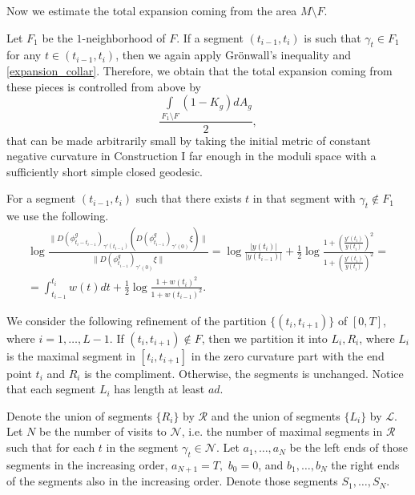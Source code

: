 \documentclass[12pt]{article}
\numberwithin{equation}{section}
\theoremstyle{definition}
\begin{document}
Now we estimate the total expansion coming from the area $M\setminus F$. 

Let $F_1$ be the $1$-neighborhood of $F$. If a segment $(t_{i-1}, t_{i})$ is such that $\gamma_t\in F_1$ for any $t\in(t_{i-1},t_i)$, then we again apply Gr\"onwall's inequality and \eqref{expansion_collar}. Therefore, we obtain that the total expansion coming from these pieces is controlled from above by 
\begin{equation}\label{input_1_nbd}
\frac{\int\limits_{F_1\setminus F}(1-K_g)dA_g}{2},
\end{equation}
that can be made arbitrarily small by taking the initial metric of constant negative curvature in Construction I far enough in the moduli space with a sufficiently short simple closed geodesic.

For a segment $(t_{i-1}, t_{i})$ such that there exists $t$ in that segment with $\gamma_t\notin F_1$ we use the following. 
\begin{multline}\label{expansion_hands}
\log\frac{\|D(\phi^g_{t_i-t_{i-1}})_{\gamma'(t_{i-1})}(D(\phi^g_{t_{i-1}})_{\gamma'(0)}\xi)\|}{\|D(\phi^g_{t_{i-1}})_{\gamma'(0)}\xi\|} = \log\frac{|y(t_i)|}{|y(t_{i-1})|}+\frac{1}{2}\log\frac{1+\left(\frac{y'(t_i)}{y(t_i)}\right)^2}{1+\left(\frac{y'(t_i)}{y(t_i)}\right)^2}=\\ = \int_{t_{i-1}}^{t_i}w(t)dt+\frac{1}{2}\log\frac{1+w(t_i)^2}{1+w(t_{i-1})^2}.
\end{multline}

We consider the following refinement of the partition $\{(t_i, t_{i+1})\}$ of $[0,T]$, where $i=1,\dots, L-1$. If $(t_i, t_{i+1})\notin F$, then we partition it into $L_i, R_i$, where $L_i$ is the maximal segment in $[t_i, t_{i+1}]$ in the zero curvature part with the end point $t_i$ and $R_i$ is the compliment. Otherwise, the segments is unchanged. Notice that each segment $L_i$ has length at least $a d$.

Denote the union of segments $\{R_i\}$ by $\mathcal R$ and the union of segments $\{L_i\}$ by $\mathcal L$. Let $N$ be the number of visits to $\mathcal N$, i.e. the number of maximal segments in $\mathcal R$ such that for each $t$ in the segment $\gamma_t\in\mathcal N$. Let $a_1,\dots, a_N$ be the left ends of those segments in the increasing order, $a_{N+1}=T,\,\, b_0=0$,  and $b_1,\dots, b_N$ the right ends of the segments also in the increasing order. Denote those segments $S_1,\dots,S_N$. 

\end{document}
